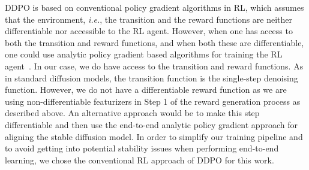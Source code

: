   DDPO is based on conventional policy gradient algorithms in RL, which assumes that the environment, \textit{i.e.}, the transition and the reward functions are neither differentiable nor accessible to the RL agent. However, when one has access to both the transition and reward functions, and when both these are differentiable, one could use analytic policy gradient based algorithms for training the RL agent~\cite{wiedemann2023training}. In our case, we do have access to the transition and reward functions. As in standard diffusion models, the transition function is the single-step denoising function. However, we do not have a differentiable reward function as we are using non-differentiable featurizers in Step 1 of the reward generation process as described above. An alternative approach would be to make this step differentiable and then use the end-to-end analytic policy gradient approach for aligning the stable diffusion model. In order to simplify our training pipeline and to avoid getting into potential stability issues when performing end-to-end learning, we chose the conventional RL approach of DDPO for this work.



